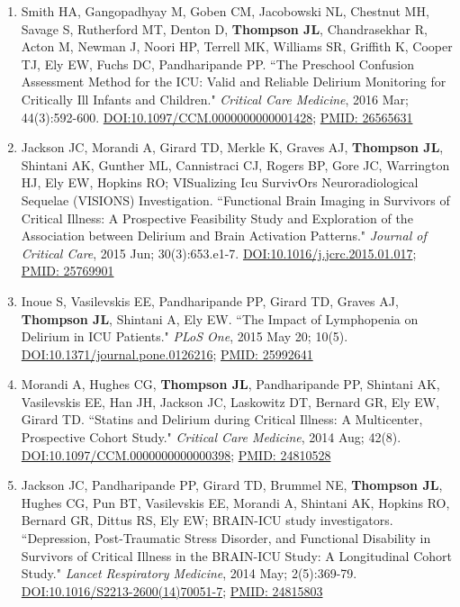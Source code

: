 \documentclass[5pt]{article}
\begin{document}
\begin{enumerate}
\item Smith HA, Gangopadhyay M, Goben CM, Jacobowski NL, Chestnut MH, Savage S, Rutherford MT, Denton D, \textbf{Thompson JL}, Chandrasekhar R, Acton M, Newman J, Noori HP, Terrell MK, Williams SR, Griffith K, Cooper TJ, Ely EW, Fuchs DC, Pandharipande PP. ``The Preschool Confusion Assessment Method for the ICU: Valid and Reliable Delirium Monitoring for Critically Ill Infants and Children." \emph{Critical Care Medicine}, 2016 Mar; 44(3):592-600. \href{https://doi.org/10.1097/CCM.0000000000001428}{DOI:10.1097/CCM.0000000000001428}; \href{https://www.ncbi.nlm.nih.gov/pubmed/26565631}{PMID: 26565631}
\item Jackson JC, Morandi A, Girard TD, Merkle K, Graves AJ, \textbf{Thompson JL}, Shintani AK, Gunther ML, Cannistraci CJ, Rogers BP, Gore JC, Warrington HJ, Ely EW, Hopkins RO; VISualizing Icu SurvivOrs Neuroradiological Sequelae (VISIONS) Investigation. ``Functional Brain Imaging in Survivors of Critical Illness: A Prospective Feasibility Study and Exploration of the Association between Delirium and Brain Activation Patterns." \emph{Journal of Critical Care}, 2015 Jun; 30(3):653.e1-7. \href{https://doi.org/10.1016/j.jcrc.2015.01.017}{DOI:10.1016/j.jcrc.2015.01.017}; \href{https://www.ncbi.nlm.nih.gov/pubmed/25769901}{PMID: 25769901}
\item Inoue S, Vasilevskis EE, Pandharipande PP, Girard TD, Graves AJ, \textbf{Thompson JL}, Shintani A, Ely EW. ``The Impact of Lymphopenia on Delirium in ICU Patients." \emph{PLoS One}, 2015 May 20; 10(5). \href{https://doi.org/10.1371/journal.pone.0126216}{DOI:10.1371/journal.pone.0126216}; \href{https://www.ncbi.nlm.nih.gov/pubmed/25992641}{PMID: 25992641}
\item Morandi A, Hughes CG, \textbf{Thompson JL}, Pandharipande PP, Shintani AK, Vasilevskis EE, Han JH, Jackson JC, Laskowitz DT, Bernard GR, Ely EW, Girard TD. ``Statins and Delirium during Critical Illness: A Multicenter, Prospective Cohort Study." \emph{Critical Care Medicine}, 2014 Aug; 42(8). \href{https://doi.org/10.1097/CCM.0000000000000398}{DOI:10.1097/CCM.0000000000000398}; \href{https://www.ncbi.nlm.nih.gov/pubmed/24810528}{PMID: 24810528}
\item Jackson JC, Pandharipande PP, Girard TD, Brummel NE, \textbf{Thompson JL}, Hughes CG, Pun BT, Vasilevskis EE, Morandi A, Shintani AK, Hopkins RO, Bernard GR, Dittus RS, Ely EW; BRAIN-ICU study investigators. ``Depression, Post-Traumatic Stress Disorder, and Functional Disability in Survivors of Critical Illness in the BRAIN-ICU Study: A Longitudinal Cohort Study." \emph{Lancet Respiratory Medicine}, 2014 May; 2(5):369-79. \href{https://doi.org/10.1016/S2213-2600(14)70051-7}{DOI:10.1016/S2213-2600(14)70051-7}; \href{https://www.ncbi.nlm.nih.gov/pubmed/24815803}{PMID: 24815803}

\end{enumerate}
\end{document}
